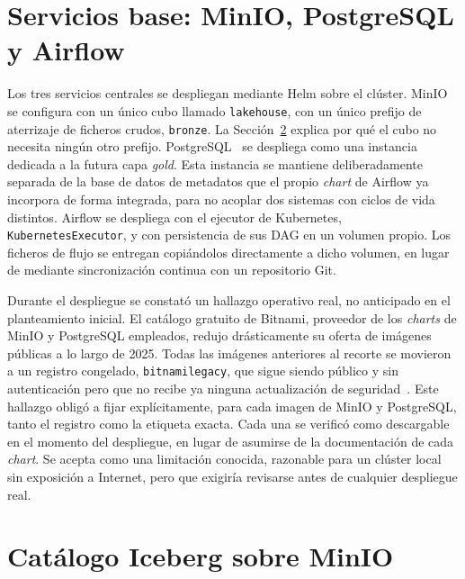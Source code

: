\section{Servicios base: MinIO, PostgreSQL y Airflow}
\label{sec:infraestructura_servicios}

Los tres servicios centrales se despliegan mediante Helm sobre el clúster.
MinIO se configura con un único cubo llamado \texttt{lakehouse}, con un
único prefijo de aterrizaje de ficheros crudos, \texttt{bronze}. La
Sección~\ref{sec:infraestructura_iceberg} explica por qué el cubo no
necesita ningún otro prefijo. PostgreSQL~\cite{postgresql_docs} se despliega
como una instancia dedicada a la futura capa \textit{gold}. Esta instancia
se mantiene
deliberadamente separada de la base de datos de metadatos que el propio
\textit{chart} de Airflow ya incorpora de forma integrada, para no acoplar
dos sistemas con ciclos de vida distintos. Airflow se despliega con el
ejecutor de Kubernetes, \texttt{KubernetesExecutor}, y con persistencia de
sus DAG en un volumen propio. Los ficheros de flujo se entregan
copiándolos directamente a dicho volumen, en lugar de mediante
sincronización continua con un repositorio Git.

Durante el despliegue se constató un hallazgo operativo real, no
anticipado en el planteamiento inicial. El catálogo gratuito de Bitnami,
proveedor de los \textit{charts} de MinIO y PostgreSQL empleados, redujo
drásticamente su oferta de imágenes públicas a lo largo de 2025. Todas las
imágenes anteriores al recorte se movieron a un registro congelado,
\texttt{bitnamilegacy}, que sigue siendo público y sin autenticación pero
que no recibe ya ninguna actualización de
seguridad~\cite{bitnami_charts_issue_35164}. Este hallazgo obligó a fijar
explícitamente, para cada imagen de MinIO y PostgreSQL, tanto el registro
como la etiqueta exacta. Cada una se verificó como descargable en el
momento del despliegue, en lugar de asumirse de la documentación de cada
\textit{chart}. Se acepta como una limitación conocida, razonable para un
clúster local sin exposición a Internet, pero que exigiría revisarse antes
de cualquier despliegue real.

\section{Catálogo Iceberg sobre MinIO}
\label{sec:infraestructura_iceberg}

